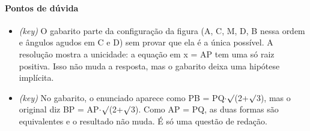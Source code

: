 \documentclass{article}%
\begin{document}
\paragraph{Pontos de dúvida}%
\begin{itemize}%
\item%
\textit{(key)} O gabarito parte da configuração da figura (A, C, M, D, B nessa ordem e ângulos agudos em C e D) sem provar que ela é a única possível. A resolução mostra a unicidade: a equação em x = AP tem uma só raiz positiva. Isso não muda a resposta, mas o gabarito deixa uma hipótese implícita.%
\item%
\textit{(key)} No gabarito, o enunciado aparece como PB = PQ$\cdot$$\surd$(2+$\surd$3), mas o original diz BP = AP$\cdot$$\surd$(2+$\surd$3). Como AP = PQ, as duas formas são equivalentes e o resultado não muda. É só uma questão de redação.%
\end{itemize}%
\end{document}
